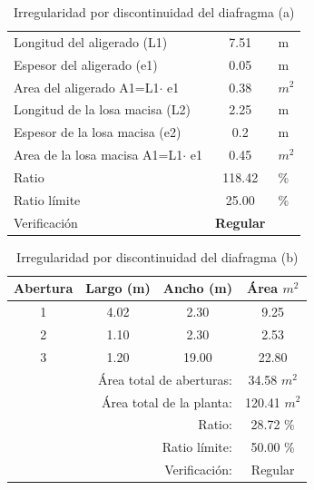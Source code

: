 \documentclass{article}%
\begin{document}
%


\begin{table}[H]%
\centering%
\caption{Irregularidad por discontinuidad del diafragma (a)}%
\begin{tabular}{|ll|c|r}%
\cline{1-3}%
\multicolumn{2}{|l|}{Longitud del aligerado (L1)} & 7.51 & \multicolumn{1}{l}{m} \\%
\cline{1-3}%
\multicolumn{2}{|l|}{Espesor del aligerado (e1)} & 0.05 & \multicolumn{1}{l}{m} \\%
\cline{1-3}%
\multicolumn{2}{|l|}{Area del aligerado A1=L1$\cdot$ e1} & 0.38 & \multicolumn{1}{l}{$m^2$} \\%
\cline{1-3}%
\multicolumn{2}{|l|}{Longitud de la losa macisa (L2)} & 2.25 & \multicolumn{1}{l}{m} \\%
\cline{1-3}%
\multicolumn{2}{|l|}{Espesor de la losa macisa (e2)} & 0.2 & \multicolumn{1}{l}{m} \\%
\cline{1-3}%
\multicolumn{2}{|l|}{Area de la losa macisa A1=L1$\cdot$ e1} & 0.45 & \multicolumn{1}{l}{$m^2$} \\%
\cline{1-3}%
\multicolumn{2}{|l|}{Ratio} & 118.42 & \multicolumn{1}{l}{\%} \\%
\cline{1-3}%
\multicolumn{2}{|l|}{Ratio límite} & 25.00 & \multicolumn{1}{l}{\%} \\%
\cline{1-3}%
\multicolumn{2}{|l|}{Verificación} & \textcolor[rgb]{ .267,  .447,  .769}{\textbf{Regular}} & \multicolumn{1}{l}{} \\%
\cline{1-3}%
\end{tabular}%
\end{table}

%


\begin{table}[H]%
\centering%
\caption{Irregularidad por discontinuidad del diafragma (b)}%
\begin{tabular}{cccc}%
\hline%
\textbf{Abertura}&\textbf{Largo (m)}&\textbf{Ancho (m)}&\textbf{Área $m^2$}\\%
\hline%
1&4.02&2.30&9.25\\%
\hline%
2&1.10&2.30&2.53\\%
\hline%
3&1.20&19.00&22.80\\%
\hline%
&\multicolumn{2}{r}{Área total de aberturas:}&34.58 $m^2$\\%
&\multicolumn{2}{r}{Área total de la planta:}&120.41 $m^2$\\%
&\multicolumn{2}{r}{Ratio:}&28.72 \%\\%
&\multicolumn{2}{r}{Ratio límite:}&50.00 \%\\%
&\multicolumn{2}{r}{Verificación:}&\textcolor[rgb]{ .267,  .447,  .769} {Regular}\\%
\end{tabular}%
\end{table}

%
\end{document}

